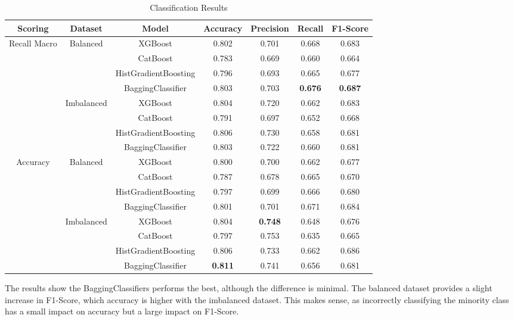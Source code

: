 \documentclass[conference]{IEEEtran}
\begin{document}
\begin{table}[t]
  \centering
  \caption{Classification Results}
  \label{tab:classification_results}
  \begin{tabular}{|c|c|c|c|c|c|c|}
    \hline
    \textbf{Scoring} & \textbf{Dataset} & \textbf{Model} & \textbf{Accuracy} & \textbf{Precision} & \textbf{Recall} & \textbf{F1-Score} \\
    \hline
    \multirow{2}{*}{Recall Macro} & \multirow{4}{*}{Balanced} & XGBoost & 0.802 & 0.701 & 0.668 & 0.683 \\
    & & CatBoost & 0.783 & 0.669 & 0.660 & 0.664 \\
    & & HistGradientBoosting & 0.796 & 0.693 & 0.665 & 0.677 \\
    & & BaggingClassifier & 0.803 & 0.703 & \textbf{0.676} & \textbf{0.687} \\
    \cline{2-7}
    & \multirow{4}{*}{Imbalanced} & XGBoost & 0.804 & 0.720 & 0.662 & 0.683 \\
    & & CatBoost & 0.791 & 0.697 & 0.652 & 0.668 \\
    & & HistGradientBoosting & 0.806 & 0.730 & 0.658 & 0.681 \\
    & & BaggingClassifier & 0.803 & 0.722 & 0.660 & 0.681 \\
    \hline
    \multirow{2}{*}{Accuracy} & \multirow{4}{*}{Balanced} & XGBoost & 0.800 & 0.700 & 0.662 &  0.677 \\
    & & CatBoost & 0.787 & 0.678 & 0.665 & 0.670 \\
    & & HistGradientBoosting & 0.797 & 0.699 & 0.666 & 0.680 \\
    & & BaggingClassifier & 0.801 & 0.701 & 0.671 & 0.684 \\
    \cline{2-7}
    & \multirow{4}{*}{Imbalanced} & XGBoost & 0.804 & \textbf{0.748} & 0.648 & 0.676 \\
    & & CatBoost & 0.797 & 0.753 & 0.635 & 0.665\\
    & & HistGradientBoosting & 0.806 & 0.733 & 0.662 & 0.686 \\
    & & BaggingClassifier & \textbf{0.811} & 0.741 & 0.656 & 0.681 \\
    \hline
  \end{tabular}
\end{table}

The results show the BaggingClassifiers performs the best, although the difference is minimal. The balanced dataset provides a slight increase in F1-Score, which accuracy is higher with the imbalanced dataset. This makes sense, as incorrectly classifying the minority class has a small impact on accuracy but a large impact on F1-Score.
\end{document}
